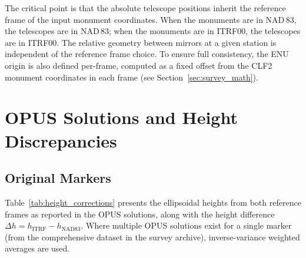 \documentclass[11pt,letterpaper]{article}
\begin{document}
The critical point is that the absolute telescope positions inherit the reference frame of the input monument coordinates. When the monuments are in NAD\,83, the telescopes are in NAD\,83; when the monuments are in ITRF00, the telescopes are in ITRF00. The relative geometry between mirrors at a given station is independent of the reference frame choice. To ensure full consistency, the ENU origin is also defined per-frame, computed as a fixed offset from the CLF2 monument coordinates in each frame (see Section~\ref{sec:survey_math}).





\section{OPUS Solutions and Height Discrepancies}

\subsection{Original Markers}

Table~\ref{tab:height_corrections} presents the ellipsoidal heights from both reference frames as reported in the OPUS solutions, along with the height difference $\Delta h = h_{\text{ITRF}} - h_{\text{NAD83}}$. Where multiple OPUS solutions exist for a single marker (from the comprehensive dataset in the survey archive), inverse-variance weighted averages are used.
\end{document}

